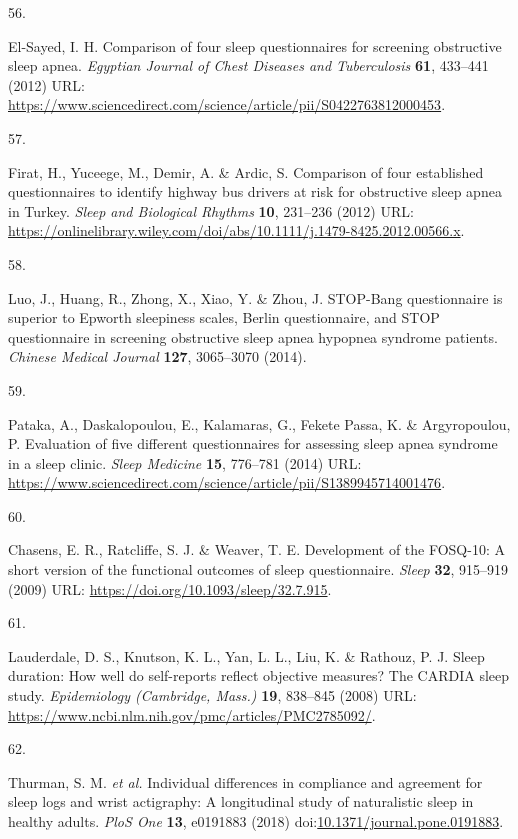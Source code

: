 \documentclass[
  10pt,
]{scrbook}
\newlength{\cslhangindent}
\newlength{\csllabelwidth}
\newlength{\cslentryspacingunit} %
\newenvironment{CSLReferences}[2] %
 {%
  \setlength{\parindent}{0pt}
  \ifodd #1
  \let\oldpar\par
  \def\par{\hangindent=\cslhangindent\oldpar}
  \fi
  \setlength{\parskip}{#2\cslentryspacingunit}
 }%
 {}
\newcommand{\CSLLeftMargin}[1]{\parbox[t]{\csllabelwidth}{#1}}
\newcommand{\CSLRightInline}[1]{\parbox[t]{\linewidth - \csllabelwidth}{#1}\break}
\let\originaltextbf\textbf
\renewcommand{\textbf}[1]{\textcolor{color1}{\originaltextbf{#1}}}
\begin{document}
\begin{CSLReferences}{0}{0}
\leavevmode{}%
\CSLLeftMargin{56. }%
\CSLRightInline{El-Sayed, I. H. Comparison of four sleep questionnaires
for screening obstructive sleep apnea. \emph{Egyptian Journal of Chest
Diseases and Tuberculosis} \textbf{61}, 433--441 (2012) URL:
\url{https://www.sciencedirect.com/science/article/pii/S0422763812000453}.}

\leavevmode{}%
\CSLLeftMargin{57. }%
\CSLRightInline{Firat, H., Yuceege, M., Demir, A. \& Ardic, S.
Comparison of four established questionnaires to identify highway bus
drivers at risk for obstructive sleep apnea in Turkey. \emph{Sleep and
Biological Rhythms} \textbf{10}, 231--236 (2012) URL:
\url{https://onlinelibrary.wiley.com/doi/abs/10.1111/j.1479-8425.2012.00566.x}.}

\leavevmode{}%
\CSLLeftMargin{58. }%
\CSLRightInline{Luo, J., Huang, R., Zhong, X., Xiao, Y. \& Zhou, J.
STOP-Bang questionnaire is superior to Epworth sleepiness scales, Berlin
questionnaire, and STOP questionnaire in screening obstructive sleep
apnea hypopnea syndrome patients. \emph{Chinese Medical Journal}
\textbf{127}, 3065--3070 (2014).}

\leavevmode{}%
\CSLLeftMargin{59. }%
\CSLRightInline{Pataka, A., Daskalopoulou, E., Kalamaras, G., Fekete
Passa, K. \& Argyropoulou, P. Evaluation of five different
questionnaires for assessing sleep apnea syndrome in a sleep clinic.
\emph{Sleep Medicine} \textbf{15}, 776--781 (2014) URL:
\url{https://www.sciencedirect.com/science/article/pii/S1389945714001476}.}

\leavevmode{}%
\CSLLeftMargin{60. }%
\CSLRightInline{Chasens, E. R., Ratcliffe, S. J. \& Weaver, T. E.
Development of the FOSQ-10: A short version of the functional outcomes
of sleep questionnaire. \emph{Sleep} \textbf{32}, 915--919 (2009) URL:
\url{https://doi.org/10.1093/sleep/32.7.915}.}

\leavevmode{}%
\CSLLeftMargin{61. }%
\CSLRightInline{Lauderdale, D. S., Knutson, K. L., Yan, L. L., Liu, K.
\& Rathouz, P. J. Sleep duration: How well do self-reports reflect
objective measures? The CARDIA sleep study. \emph{Epidemiology
(Cambridge, Mass.)} \textbf{19}, 838--845 (2008) URL:
\url{https://www.ncbi.nlm.nih.gov/pmc/articles/PMC2785092/}.}

\leavevmode{}%
\CSLLeftMargin{62. }%
\CSLRightInline{Thurman, S. M. \emph{et al.} Individual differences in
compliance and agreement for sleep logs and wrist actigraphy: A
longitudinal study of naturalistic sleep in healthy adults. \emph{PloS
One} \textbf{13}, e0191883 (2018)
doi:\href{https://doi.org/10.1371/journal.pone.0191883}{10.1371/journal.pone.0191883}.}


\end{CSLReferences}
\end{document}
